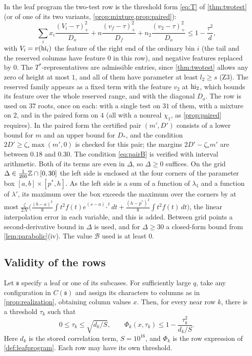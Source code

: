 In the leaf program the two-test row is the threshold form \eqref{eq:T} of \cref{thm:twotest} (or of one of
its two variants, \cref{prop:mixture,prop:paired}):
\[
  \sum_ix_i\frac{(V_i-\tau)_+^2}{D_o}+n\frac{(v_f-\tau)_+^2}{D_f}+n_2\frac{(v_2-\tau)_+^2}{D_o}\le1-\frac{\tau^2}d,
\]
with $V_i=v(\mathrm{hi}_i)$ the feature of the right end of the ordinary bin $i$ (the tail and the
reserved columns have feature $0$ in this row), and negative features replaced by $0$. The
$T^*$-representatives are admissible entries, since \cref{thm:twotest} allows any zero of height at
most $1$, and all of them have parameter at least $l_2\ge s$ (Z3). The reserved family appears as a
fixed term with the feature $v_2$ at $\mathrm{hi}_2$, which bounds its feature over the whole reserved range,
and with the diagonal $D_o$. The row is used on $37$ roots, once on each: with a single test on $31$
of them, with a mixture on $2$, and in the paired form on $4$ (all with a nonreal $\chi_1$, as
\cref{prop:paired} requires). In the paired form the certified pair $(m',D')$ consists of a lower
bound for $m$ and an upper bound for $D_*$, and the condition $2D'\ge\zeta_*\max(m',0)$ is checked for
this pair; the margins $2D'-\zeta_*m'$ are between $0.18$ and $0.30$. The condition \eqref{eq:pairB} is
verified with interval arithmetic. Both of its terms are even in $\Delta$, so $\Delta\ge0$ suffices. On the grid
$\Delta\in\frac1{200}\mathbb{Z}\cap[0,30]$ the left side is enclosed at the four corners of the parameter box
$[a,b]\times[p^*,h]$. As the left side is a sum of a function of $\lambda_1$ and a function of $\lambda'$, its
maximum over the box exceeds the maximum over the corners by at most
$\frac\zeta{2\mathcal N}\bigl(\frac{(b-a)^2}8\int t^2f(t)e^{(s-a)_+t}\,dt+\frac{(h-p^*)^2}8\int t^2f(t)\,dt\bigr)$, the linear
interpolation error in each variable, and this is added. Between grid points a
second-derivative bound in $\Delta$ is used, and for $\Delta\ge30$ a closed-form bound from
\cref{lem:parabolic}(iv). The value $\mathcal B$ used is at least $0$.

\subsection{Validity of the rows}

\begin{proposition}\label{prop:rowsvalid}
Let $\mathfrak s$ specify a leaf or one of its subcases. For sufficiently large $q$,
take any configuration in $C(\mathfrak s)$ and assign its characters to columns as in
\cref{prop:realization}, obtaining column values $x$. Then, for every near row $k$,
there is a threshold $\tau_k$ such that
\[
  0\le\tau_k\le\sqrt{d_k/S},\qquad
  \Phi_k(x,\tau_k)\le1-\frac{\tau_k^2}{d_k/S}.
\]
Here $d_k$ is the stored correlation term, $S=10^{16}$, and $\Phi_k$ is the row expression of
\cref{def:leafprogram}. Each row may have its own threshold.
\end{proposition}

